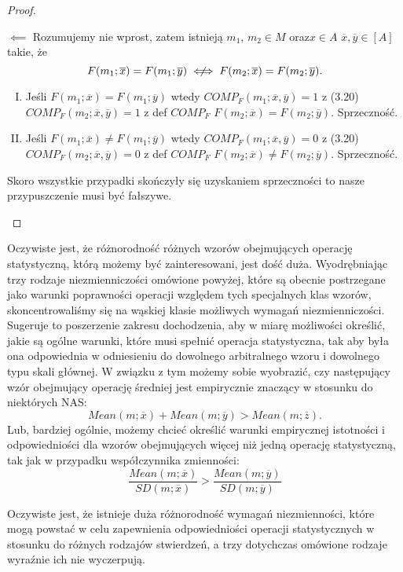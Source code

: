 \documentclass[12pt,a4paper]{report}
\newcommand{\domkniecie}[1]{\left\lbrack{#1}\right\rbrack}
\newcommand{\notiff}{%
  \mathrel{{\ooalign{\hidewidth$\not\phantom{"}$\hidewidth\cr$\iff$}}}}
\begin{document}
\begin{proof}
\begin{enumerate}
$\impliedby$
Rozumujemy nie wprost, zatem istnieją $m_1$, $m_2 \in M$ oraz$x\in A$ $\overline{x}, \overline{y} \in \domkniecie{A}$ takie, że
$$
F(m_{1};\overline{x})=F(m_{1};\overline{y}) \notiff F(m_{2};\overline{x})=F(m_{2};\overline{y}).
$$
\begin{enumerate}[I.]
\item
Jeśli $F(m_1;\overline{x})=F(m_1;\overline{y})$ wtedy $COMP_{F}(m_1;\overline{x},\overline{y})=1$ z (3.20) $COMP_{F}(m_2;\overline{x},\overline{y})=1$ z def $COMP_F$ $F(m_2;\overline{x})=F(m_2;\overline{y})$. Sprzeczność.
\item
Jeśli $F(m_1;\overline{x})\ne F(m_1;\overline{y})$ wtedy $COMP_{F}(m_1;\overline{x},\overline{y})=0$ z (3.20) $COMP_{F}(m_2;\overline{x},\overline{y})=0$ z def $COMP_F$ $F(m_2;\overline{x})\ne F(m_2;\overline{y})$. Sprzeczność.
\end{enumerate}
Skoro wszystkie przypadki skończyły się uzyskaniem sprzeczności to nasze przypuszczenie musi być fałszywe.
\end{enumerate}
\end{proof}

Oczywiste jest, że różnorodność różnych wzorów obejmujących operację statystyczną, którą możemy być zainteresowani, jest dość duża. Wyodrębniając trzy rodzaje niezmienniczości omówione powyżej, które są obecnie postrzegane jako warunki poprawności operacji względem tych specjalnych klas wzorów, skoncentrowaliśmy się na wąskiej klasie możliwych wymagań niezmienniczości. Sugeruje to poszerzenie zakresu dochodzenia, aby w miarę możliwości określić, jakie są ogólne warunki, które musi spełnić operacja statystyczna, tak aby była ona odpowiednia w odniesieniu do dowolnego arbitralnego wzoru i dowolnego typu skali głównej. W związku z tym możemy sobie wyobrazić, czy następujący wzór obejmujący operację średniej jest empirycznie znaczący w stosunku do niektórych NAS:
\begin{equation*}
Mean(m;\overline{x})+Mean(m;\overline{y})>Mean(m;\overline{z}).
\end{equation*}
Lub, bardziej ogólnie, możemy chcieć określić warunki empirycznej istotności i odpowiedniości dla wzorów obejmujących więcej niż jedną operację statystyczną, tak jak w przypadku współczynnika zmienności:
\begin{equation*}
\frac{Mean(m;\overline{x})}{SD(m;\overline{x})} > \frac{Mean(m;\overline{y})}{SD(m;\overline{y})}
\end{equation*}


Oczywiste jest, że istnieje duża różnorodność wymagań niezmienności, które mogą powstać w celu zapewnienia odpowiedniości operacji statystycznych w stosunku do różnych rodzajów stwierdzeń, a trzy dotychczas omówione rodzaje wyraźnie ich nie wyczerpują.
\end{document}
